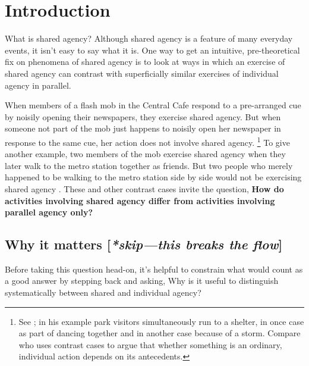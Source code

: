 \documentclass[12pt,\papersize]{extarticle}
\begin{document}
\setlength\footnotesep{1em}




\maketitle
%
%
%



\section{Introduction}
What is shared agency?
Although shared agency is a feature of many everyday events,
 it isn't easy to say what it is.
One way to get an intuitive, pre-theoretical fix on phenomena of shared agency is to look at ways in which
	an exercise of shared agency 
	can contrast with
	superficially similar exercises of individual agency in parallel.

When members of a flash mob in the Central Cafe respond to a pre-arranged cue by noisily opening their newspapers, they exercise shared agency. 
But when someone not part of the mob just happens to noisily open her newspaper in response to the same cue, her action does not involve shared agency.%
\footnote{
See \citet{Searle:1990em}; in his example park visitors simultaneously run to a shelter, in once case as part of dancing together and in another case because of a storm. 
Compare \citet{Pears:1971fk} who uses contrast cases to argue that whether something is an ordinary, individual action depends on its antecedents. 
}
To give another example, 
 two members of the mob exercise shared agency when they 
   later walk to the metro station together as friends. 
But two people who merely happened to be walking to the metro station side by side would not be exercising shared agency \citep{gilbert_walking_1990}. 
These and other contrast cases invite the question, 
\textbf{
How do activities involving shared agency differ from activities involving parallel agency only? }


\subsection{Why it matters [\emph{*skip---this breaks the flow}]}
Before taking this question head-on,
it's helpful to constrain what would count as a good answer by
stepping back and asking,
	Why is it useful 
	to  distinguish systematically between shared and individual agency?
	
\end{document}
